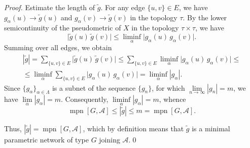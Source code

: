 \documentclass[10pt,a4paper]{amsart}
\def\mpn{\operatorname{mpn}}
\begin{document}
\begin{proof}
Estimate the length of $\widetilde{g}$. For any edge $\{u, v\}\in E$, we have $g_{\alpha}(u)\rightarrow \widetilde{g}(u)$ and $g_{\alpha}(v)\rightarrow \widetilde{g}(v)$ in the topology $\tau$. By the lower semicontinuity of the pseudometric of $X$ in the topology $\tau\times \tau$, we have
$$
\bigl|\widetilde{g}(u)\, \widetilde{g}(v)\bigr| \le \liminf_{\alpha} \bigl|g_{\alpha}(u)\, g_{\alpha}(v)\bigr|.
$$
Summing over all edges, we obtain
\begin{multline*}
|\widetilde{g}| = \sum_{\{u, v\}\in E} \bigl|\widetilde{g}(u)\, \widetilde{g}(v)\bigr| \le \sum_{\{u, v\}\in E} \liminf_{\alpha} \bigl|g_{\alpha}(u)\, g_{\alpha}(v)\bigr| \le \\ \le \liminf_{\alpha} \sum_{\{u, v\}\in E} \bigl|g_{\alpha}(u)\, g_{\alpha}(v)\bigr| = \liminf_{\alpha} |g_{\alpha}|.
\end{multline*}
Since $\bigl\{g_{\alpha}\bigr\}_{\alpha\in \Lambda}$ is a subnet of the sequence $\{g_n\}$, for which $\lim\limits_{n\rightarrow \infty} |g_n| = m$, we have $\lim\limits_{\alpha} |g_{\alpha}| = m$. Consequently, $\liminf\limits_{\alpha} |g_{\alpha}| = m$, whence
$$
\mpn[G, \mathcal{A}]\le |\widetilde{g}| \le m = \mpn[G, \mathcal{A}].
$$

Thus, $|\widetilde{g}| = \mpn[G, \mathcal{A}]$, which by definition means that $\widetilde{g}$ is a minimal parametric network of type $G$ joining $\mathcal{A}$.\qed

\end{proof}
\end{document}
